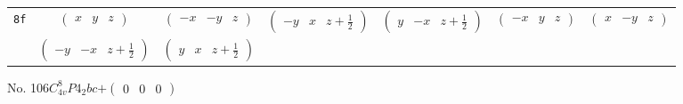\documentclass[fleqn,9pt,landscape]{jsarticle}
\begin{document}
\begin{center}
\begin{longtable}{ccccccc}
{\tt 8f} & $ \begin{pmatrix} x & y & z \end{pmatrix} $ & $ \begin{pmatrix} - x & - y & z \end{pmatrix} $ & $ \begin{pmatrix} - y & x & z + \frac{1}{2} \end{pmatrix} $ & $ \begin{pmatrix} y & - x & z + \frac{1}{2} \end{pmatrix} $ & $ \begin{pmatrix} - x & y & z \end{pmatrix} $ & $ \begin{pmatrix} x & - y & z \end{pmatrix} $ \\
& $ \begin{pmatrix} - y & - x & z + \frac{1}{2} \end{pmatrix} $ & $ \begin{pmatrix} y & x & z + \frac{1}{2} \end{pmatrix} $ & $  $ & $  $ & $  $ & $  $ \\
\end{longtable}
\end{center}
\newpage
No. 106\quad$C_{4v}^{8}$\quad$P4_2bc$\quad[ tetragonal ]\quad$+\begin{pmatrix} 0 & 0 & 0 \end{pmatrix}$
\end{document}
